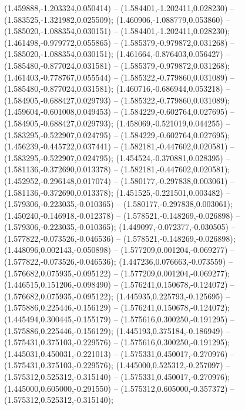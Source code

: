  (1.459888,-1.203324,0.050414) -- (1.584401,-1.202411,0.028230) -- (1.583525,-1.321982,0.025509);
 (1.460906,-1.088779,0.053860) -- (1.585020,-1.088354,0.030151) -- (1.584401,-1.202411,0.028230);
 (1.461498,-0.979772,0.055865) -- (1.585379,-0.979872,0.031268) -- (1.585020,-1.088354,0.030151);
 (1.461664,-0.876403,0.056427) -- (1.585480,-0.877024,0.031581) -- (1.585379,-0.979872,0.031268);
 (1.461403,-0.778767,0.055544) -- (1.585322,-0.779860,0.031089) -- (1.585480,-0.877024,0.031581);
 (1.460716,-0.686944,0.053218) -- (1.584905,-0.688427,0.029793) -- (1.585322,-0.779860,0.031089);
 (1.459604,-0.601008,0.049453) -- (1.584229,-0.602764,0.027695) -- (1.584905,-0.688427,0.029793);
 (1.458069,-0.521019,0.044255) -- (1.583295,-0.522907,0.024795) -- (1.584229,-0.602764,0.027695);
 (1.456239,-0.445722,0.037441) -- (1.582181,-0.447602,0.020581) -- (1.583295,-0.522907,0.024795);
 (1.454524,-0.370881,0.028395) -- (1.581136,-0.372690,0.013378) -- (1.582181,-0.447602,0.020581);
 (1.452952,-0.296148,0.017074) -- (1.580177,-0.297838,0.003061) -- (1.581136,-0.372690,0.013378);
 (1.451525,-0.221501,0.003482) -- (1.579306,-0.223035,-0.010365) -- (1.580177,-0.297838,0.003061);
 (1.450240,-0.146918,-0.012378) -- (1.578521,-0.148269,-0.026898) -- (1.579306,-0.223035,-0.010365);
 (1.449097,-0.072377,-0.030505) -- (1.577822,-0.073526,-0.046536) -- (1.578521,-0.148269,-0.026898);
 (1.448096,0.002143,-0.050898) -- (1.577209,0.001204,-0.069277) -- (1.577822,-0.073526,-0.046536);
 (1.447236,0.076663,-0.073559) -- (1.576682,0.075935,-0.095122) -- (1.577209,0.001204,-0.069277);
 (1.446515,0.151206,-0.098490) -- (1.576241,0.150678,-0.124072) -- (1.576682,0.075935,-0.095122);
 (1.445935,0.225793,-0.125695) -- (1.575886,0.225446,-0.156129) -- (1.576241,0.150678,-0.124072);
 (1.445494,0.300445,-0.155179) -- (1.575616,0.300250,-0.191295) -- (1.575886,0.225446,-0.156129);
 (1.445193,0.375184,-0.186949) -- (1.575431,0.375103,-0.229576) -- (1.575616,0.300250,-0.191295);
 (1.445031,0.450031,-0.221013) -- (1.575331,0.450017,-0.270976) -- (1.575431,0.375103,-0.229576);
 (1.445000,0.525312,-0.257097) -- (1.575312,0.525312,-0.315140) -- (1.575331,0.450017,-0.270976);
 (1.445000,0.605000,-0.291550) -- (1.575312,0.605000,-0.357372) -- (1.575312,0.525312,-0.315140);
